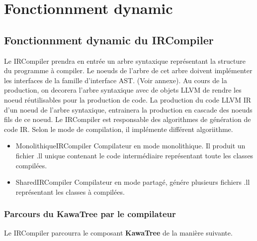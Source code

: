 \documentclass{article}
\begin{document}
\section{Fonctionnment dynamic}


\subsection{Fonctionnment dynamic du IRCompiler}

Le IRCompiler prendra en entrée un arbre syntaxique représentant la structure du programme à compiler.
Le noeuds de l'arbre de cet arbre doivent implémenter les interfaces de la famille d'interface AST. (Voir annexe).
Au cours de la production, on decorera l'arbre syntaxique avec de objets LLVM de rendre les noeud réutilisables
pour la production de code. La production du code LLVM IR d'un noeud de l'arbre syntaxique, entrainera la production en cascade des noeuds fils de ce noeud. Le IRCompiler est responsable des algorithmes de génération de code IR. Selon le mode de compilation,
il implémente différent algoriithme. \\
 \begin{itemize}
	\item MonolithiqueIRCompiler Compilateur en mode monolithique. Il produit un fichier .ll unique contenant le code intermédiaire 
	représentant toute les classes compilées. 
	\item SharedIRCompiler Compilateur en mode partagé, génére plusieurs fichiers .ll représentant les classes à compilées.
	\end{itemize}

\subsubsection{Parcours du KawaTree par le compilateur}

Le IRCompiler parcourra le composant \textbf{KawaTree} de la manière suivante.
\end{document}

